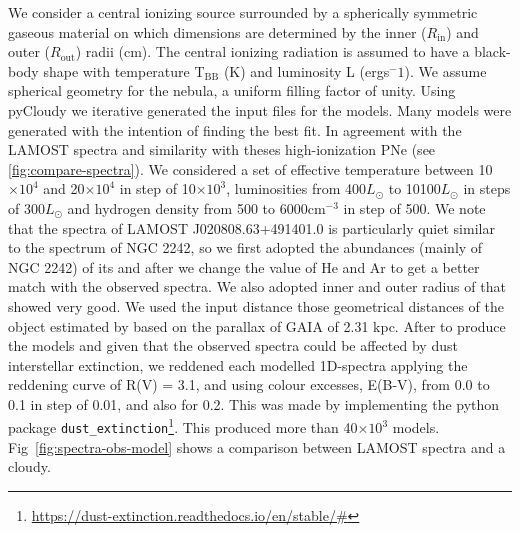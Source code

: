 \documentclass[fleqn,usenatbib]{mnras}
\begin{document}
We consider a central ionizing source surrounded by a spherically symmetric
gaseous material on which dimensions are determined by the inner ($R_{\mathrm{in}}$) and
outer ($R_{\mathrm{out}}$) radii (cm). The central ionizing radiation is assumed to have a
black-body shape with temperature T$_{\mathrm{BB}}$ (K) and luminosity L
(ergs$^-1$). We assume spherical geometry for the nebula, a uniform filling factor of unity.
Using {\sc pyCloudy} we iterative generated the input files for the models.
Many models were generated with the intention of finding the best fit.
In agreement with the LAMOST spectra and similarity with theses high-ionization PNe
(see \ref{fig:compare-spectra}).
We considered a set of effective temperature between 10$\times10^4$ and 20$\times10^4$
in step of 10$\times10^3$, luminosities from 400$L_{\odot}$ to 10100$L_{\odot}$ in steps
of 300$L_{\odot}$ and hydrogen density from 500 to  6000cm$^{-3}$ in step of 500.
We note that the spectra of LAMOST J020808.63+491401.0 is particularly quiet similar to the
spectrum of NGC 2242, so we first adopted the abundances (mainly of NGC 2242) of its and after
we change the value of He and Ar to get a better match with the observed spectra.
We also adopted inner and outer radius of that showed very good. We used the input
distance those geometrical distances of the object estimated by \citet{Bailer:2021} based on
the parallax of GAIA of 2.31 kpc.
After to produce the models and given that the observed spectra could be affected by
dust interstellar extinction, we reddened each modelled 1D-spectra applying the
reddening curve of R(V) = 3.1, and using colour excesses, E(B-V), from 0.0 to 0.1 in
step of 0.01, and also for 0.2. This was made by implementing the python
package \texttt{dust\_extinction}\footnote{\url{https://dust-extinction.readthedocs.io/en/stable/#}}.
This produced more than 40$\times10^3$ models. Fig~\ref{fig:spectra-obs-model} shows a
comparison between LAMOST spectra and a {\sc cloudy}. %
\end{document}
